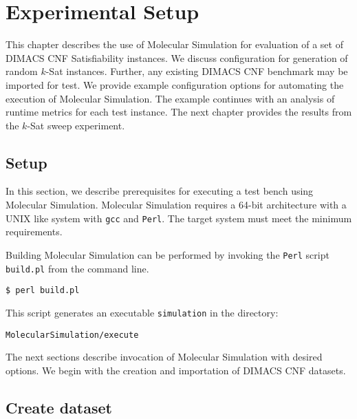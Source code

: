 \chapter{Experimental Setup}


This chapter describes the use of Molecular Simulation for evaluation of a set of DIMACS CNF {\sc Satisfiability} instances.  We discuss configuration for generation of random $k$-{\sc Sat} instances.  Further, any existing DIMACS CNF benchmark may be imported for test.  We provide example configuration options for automating the execution of Molecular Simulation.  The example continues with an analysis of runtime metrics for each test instance.  The next chapter provides the results from the $k$-{\sc Sat} sweep experiment.

	\section{Setup}


In this section, we describe prerequisites for executing a test bench using Molecular Simulation.  Molecular Simulation requires a 64-bit architecture with a UNIX like system with \texttt{gcc} and \texttt{Perl}.  The target system must meet the minimum requirements.  

Building Molecular Simulation can be performed by invoking the \texttt{Perl} script \texttt{build.pl} from the command line.

\begin{center}
\texttt{\$ perl build.pl}
\end{center}

\noindent This script generates an executable \texttt{simulation} in the directory:

\begin{center}
\texttt{MolecularSimulation/execute}
\end{center}

The next sections describe invocation of Molecular Simulation with desired options.  We begin with the creation and importation of DIMACS CNF datasets.

		

	\section{Create dataset}

